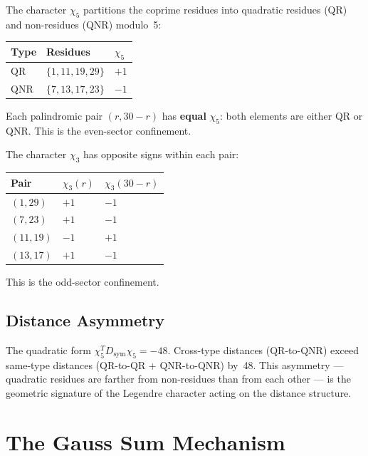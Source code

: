 \documentclass[11pt,letterpaper]{article}
\theoremstyle{definition}
\begin{document}
The character $\chi_5$ partitions the coprime residues into quadratic residues (QR) and non-residues (QNR) modulo~5:

\begin{center}
\begin{tabular}{@{}lll@{}}
\toprule
Type & Residues & $\chi_5$ \\
\midrule
QR  & $\{1, 11, 19, 29\}$ & $+1$ \\
QNR & $\{7, 13, 17, 23\}$ & $-1$ \\
\bottomrule
\end{tabular}
\end{center}

Each palindromic pair $(r, 30 - r)$ has \textbf{equal} $\chi_5$: both elements are either QR or QNR. This is the even-sector confinement.

The character $\chi_3$ has opposite signs within each pair:

\begin{center}
\begin{tabular}{@{}lll@{}}
\toprule
Pair & $\chi_3(r)$ & $\chi_3(30-r)$ \\
\midrule
$(1, 29)$  & $+1$ & $-1$ \\
$(7, 23)$  & $+1$ & $-1$ \\
$(11, 19)$ & $-1$ & $+1$ \\
$(13, 17)$ & $+1$ & $-1$ \\
\bottomrule
\end{tabular}
\end{center}

This is the odd-sector confinement.

\subsection{Distance Asymmetry}

The quadratic form $\chi_5^T D_{\text{sym}} \chi_5 = -48$. Cross-type distances (QR-to-QNR) exceed same-type distances (QR-to-QR + QNR-to-QNR) by~48. This asymmetry --- quadratic residues are farther from non-residues than from each other --- is the geometric signature of the Legendre character acting on the distance structure.


\section{The Gauss Sum Mechanism}
\end{document}
